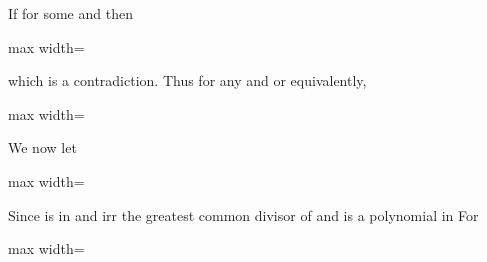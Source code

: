 \documentclass[11pt,oneside]{article}
\begin{document}
\begin{BookBody}
\noindent If  for some  and  then

\begin{center}\begin{adjustbox}{max width=\linewidth}\end{adjustbox}\end{center}

\noindent which is a contradiction. Thus for any  and  or equivalently,

\begin{center}\begin{adjustbox}{max width=\linewidth}\end{adjustbox}\end{center}

\noindent We now let

\begin{center}\begin{adjustbox}{max width=\linewidth}\end{adjustbox}\end{center}

\noindent Since  is in  and  irr the greatest common divisor of  and  is a polynomial in  For 

\begin{center}\begin{adjustbox}{max width=\linewidth}\end{adjustbox}\end{center}


\end{BookBody}
\end{document}
